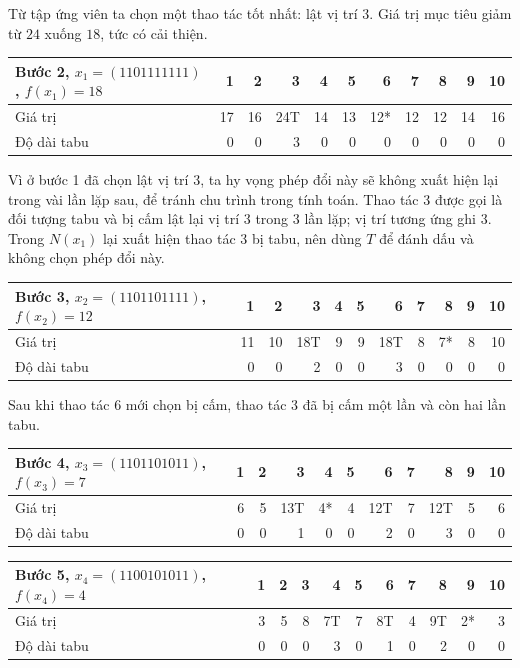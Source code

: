 \documentclass[11pt]{article}
\begin{document}
Từ tập ứng viên ta chọn một thao tác tốt nhất: lật vị trí \(3\). Giá trị mục
tiêu giảm từ \(24\) xuống \(18\), tức có cải thiện.

\begin{table}[htbp]
\centering
\scriptsize
\begin{tabular}{lrrrrrrrrrr}
\hline
Bước 2, \(x_1=(1101111111)\), \(f(x_1)=18\) & 1&2&3&4&5&6&7&8&9&10\\
\hline
Giá trị & 17&16&24T&14&13&12*&12&12&14&16\\
Độ dài tabu & 0&0&3&0&0&0&0&0&0&0\\
\hline
\end{tabular}
\end{table}

Vì ở bước 1 đã chọn lật vị trí \(3\), ta hy vọng phép đổi này sẽ không xuất
hiện lại trong vài lần lặp sau, để tránh chu trình trong tính toán. Thao tác
3 được gọi là đối tượng tabu và bị cấm lật lại vị trí \(3\) trong \(3\) lần
lặp; vị trí tương ứng ghi \(3\). Trong \(N(x_1)\) lại xuất hiện thao tác 3 bị
tabu, nên dùng \(T\) để đánh dấu và không chọn phép đổi này.

\begin{table}[htbp]
\centering
\scriptsize
\begin{tabular}{lrrrrrrrrrr}
\hline
Bước 3, \(x_2=(1101101111)\), \(f(x_2)=12\) & 1&2&3&4&5&6&7&8&9&10\\
\hline
Giá trị & 11&10&18T&9&9&18T&8&7*&8&10\\
Độ dài tabu & 0&0&2&0&0&3&0&0&0&0\\
\hline
\end{tabular}
\end{table}

Sau khi thao tác 6 mới chọn bị cấm, thao tác 3 đã bị cấm một lần và còn hai
lần tabu.

\begin{table}[htbp]
\centering
\scriptsize
\begin{tabular}{lrrrrrrrrrr}
\hline
Bước 4, \(x_3=(1101101011)\), \(f(x_3)=7\) & 1&2&3&4&5&6&7&8&9&10\\
\hline
Giá trị & 6&5&13T&4*&4&12T&7&12T&5&6\\
Độ dài tabu & 0&0&1&0&0&2&0&3&0&0\\
\hline
\end{tabular}
\end{table}

\begin{table}[htbp]
\centering
\scriptsize
\begin{tabular}{lrrrrrrrrrr}
\hline
Bước 5, \(x_4=(1100101011)\), \(f(x_4)=4\) & 1&2&3&4&5&6&7&8&9&10\\
\hline
Giá trị & 3&5&8&7T&7&8T&4&9T&2*&3\\
Độ dài tabu & 0&0&0&3&0&1&0&2&0&0\\
\hline
\end{tabular}
\end{table}
\end{document}
